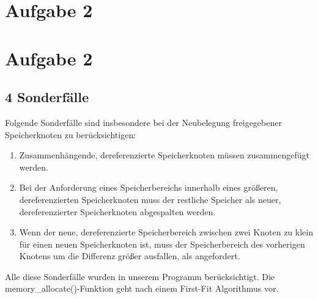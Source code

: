\documentclass[numbers=noendperiod]{scrartcl}
\begin{document}
\section*{Aufgabe 2}




\section{Aufgabe 2}
\subsection*{4 Sonderfälle}
Folgende Sonderfälle sind insbesondere bei der Neubelegung freigegebener Speicherknoten zu berücksichtigen:
\begin{enumerate}
	\item Zusammenhängende, dereferenzierte Speicherknoten müssen zusammengefügt werden.
	\item Bei der Anforderung eines Speicherbereichs innerhalb eines größeren, dereferenzierten Speicherknoten muss der restliche Speicher als neuer, dereferenzierter Speicherknoten abgespalten werden.
	\item Wenn der neue, dereferenzierte Speicherbereich zwischen zwei Knoten zu klein für einen neuen Speicherknoten ist, muss der Speicherbereich des vorherigen Knotens um die Differenz größer ausfallen, als angefordert.
\end{enumerate}
Alle diese Sonderfälle wurden in unserem Programm berücksichtigt. Die memory\_allocate()-Funktion geht nach einem First-Fit Algorithmus vor.
	
\end{document}
